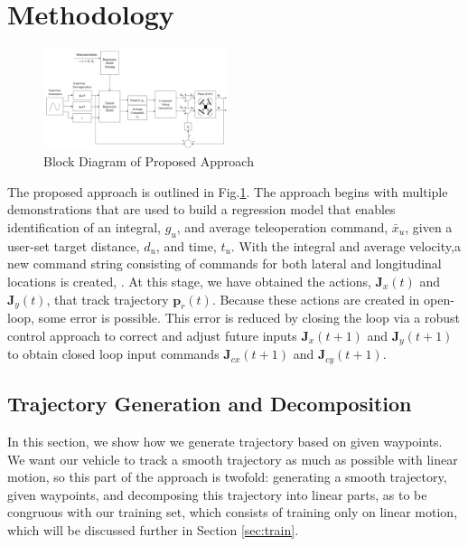 \documentclass[letterpaper, 10 pt, conference]{ieeeconf}  %
\newcommand\NB[1]{$\spadesuit$\footnote{NB: #1}}
\begin{document}
\section{Methodology}

\begin{figure}[ht]
    \includegraphics[width=0.48\textwidth]{images/blocks.PNG}
    \caption{Block Diagram of Proposed Approach}
    \label{fig:blockdiagram}
\end{figure}

The proposed approach is outlined in Fig.\ref{fig:blockdiagram}. The approach begins with multiple demonstrations that are used to  build a regression model that enables identification of an integral, $g_u$, and average teleoperation command, $\bar{x}_u$, given a user-set target distance, $d_u$, and time, $t_u$. With the integral and average velocity,a new command string consisting of commands for both lateral and longitudinal locations is created, . At this stage, we have obtained the actions, $\mathbf{J}_x(t)$ and $\mathbf{J}_y(t)$, that track trajectory $\mathbf{p}_r(t)$. Because these actions are created in open-loop, some error is possible. This error is reduced by closing the loop via a robust control approach to correct and adjust future inputs $\mathbf{J}_x(t+1)$ and $\mathbf{J}_y(t+1)$ to obtain closed loop input commands $\mathbf{J}_{cx}(t+1)$ and $\mathbf{J}_{cy}(t+1)$. %

    
\subsection{Trajectory Generation and Decomposition} \label{sec:traj}
In this section, we show how we generate trajectory based on given waypoints. We want our vehicle to track a smooth trajectory as much as possible with linear motion, so this part of the approach is twofold: generating a smooth trajectory, given waypoints, and decomposing this trajectory into linear parts, as to be congruous with our training set, which consists of training only on linear motion, which will be discussed further in Section \ref{sec:train}.
\end{document}
